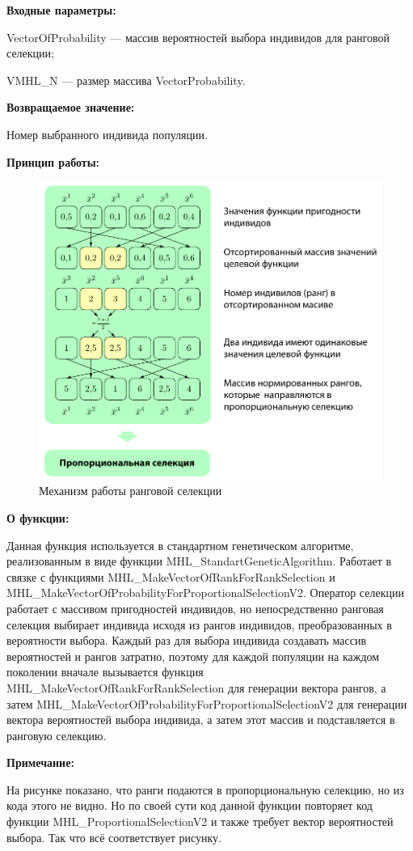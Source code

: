 \textbf{Входные параметры:}
 
 VectorOfProbability --- массив вероятностей выбора индивидов для ранговой селекции;
 
 VMHL\_N --- размер массива VectorProbability.

\textbf{Возвращаемое значение:} 

 Номер выбранного индивида популяции.

 \textbf{Принцип работы:}

\begin{figure} [h]
  \center
  \includegraphics [scale=0.8] {MHL_RankSelection_Sheme}
  \caption{Механизм работы ранговой селекции} 
  \label{img:MHL_RankSelection_Sheme}  
\end{figure}

\textbf{О функции:}

Данная функция используется в стандартном генетическом алгоритме, реализованным в виде функции MHL\_StandartGeneticAlgorithm. Работает в связке с функциями MHL\_MakeVectorOfRankForRankSelection и MHL\_MakeVectorOfProbabilityForProportionalSelectionV2. Оператор селекции работает с массивом пригодностей индивидов, но непосредственно ранговая селекция выбирает индивида исходя из рангов индивидов, преобразованных в вероятности выбора. Каждый раз для выбора индивида создавать массив вероятностей и рангов затратно, поэтому для каждой популяции на каждом поколении вначале вызывается функция MHL\_MakeVectorOfRankForRankSelection для генерации вектора рангов, а затем MHL\_MakeVectorOfProbabilityForProportionalSelectionV2 для генерации вектора вероятностей выбора индивида, а затем этот массив и подставляется в ранговую селекцию.
  
\textbf{Примечание:}

На рисунке показано, что ранги подаются в пропорциональную селекцию, но из кода этого не видно. Но по своей сути код данной функции повторяет код функции MHL\_ProportionalSelectionV2 и также требует вектор вероятностей выбора. Так что всё соответствует рисунку.

